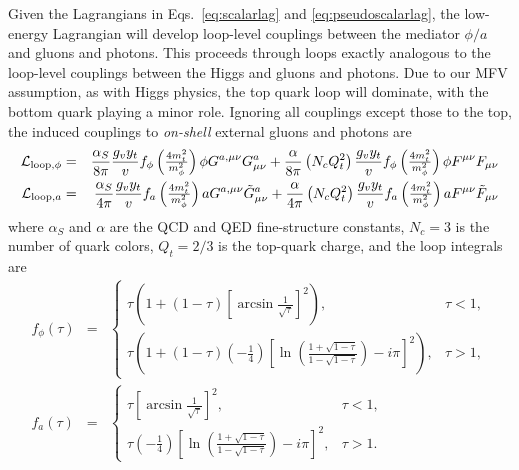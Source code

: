 Given the Lagrangians in Eqs.~\eqref{eq:scalarlag} and \ref{eq:pseudoscalarlag}, the low-energy Lagrangian will develop loop-level couplings between the mediator $\phi/a$ and gluons and photons. This proceeds through loops exactly analogous to the loop-level couplings between the Higgs and gluons and photons. Due to our MFV assumption, as with Higgs physics, the top quark loop will dominate, with the bottom quark playing a minor role. Ignoring all couplings except those to the top, the induced couplings to {\it on-shell} external gluons and photons are
\begin{eqnarray}
{\cal L}_{{\rm loop},\phi} & = & \frac{\alpha_S}{8\pi} \frac{g_v y_t}{v}f_\phi\left(\tfrac{4m_t^2}{m_\phi^2} \right)\phi G^{a,\mu\nu} G^{a}_{\mu\nu} + \frac{\alpha}{8\pi}\left(N_c Q_t^2 \right) \frac{g_v y_t}{v}f_\phi\left(\tfrac{4m_t^2}{m_\phi^2} \right) \phi F^{\mu\nu}F_{\mu\nu} \label{eq:scalarloop} \\ 
{\cal L}_{{\rm loop},a} & = &  \frac{\alpha_S}{4\pi} \frac{g_v y_t}{v}f_a\left(\tfrac{4m_t^2}{m_\phi^2} \right) a G^{a,\mu\nu} \tilde{G}^{a}_{\mu\nu} + \frac{\alpha}{4\pi}\left(N_c Q_t^2 \right) \frac{g_v y_t}{v}f_a\left(\tfrac{4m_t^2}{m_\phi^2} \right) a F^{\mu\nu}\tilde{F}_{\mu\nu} \label{eq:pseudoscalarloop}
\end{eqnarray}
where $\alpha_S$ and $\alpha$ are the QCD and QED fine-structure constants, $N_c = 3$ is the number of quark colors, $Q_t = 2/3$ is the top-quark charge, and the loop integrals are
\begin{eqnarray}
f_\phi(\tau) & = & \left\{\begin{array}{cc} \tau\left(1+(1-\tau)\left[\arcsin\tfrac{1}{\sqrt{\tau}}\right]^{2} \right),  & \tau < 1, \\  \tau\left(1+(1-\tau)\left(-\tfrac{1}{4}\right)\left[ \ln\left(\tfrac{1+\sqrt{1-\tau}}{1-\sqrt{1-\tau}} \right) - i \pi \right]^2 \right), & \tau > 1,\end{array} \right. \\
f_a(\tau) & = & \left\{\begin{array}{cc} \tau\left[\arcsin\tfrac{1}{\sqrt{\tau}}\right]^{2},  & \tau < 1, \\  \tau\left(-\tfrac{1}{4}\right)\left[ \ln\left(\tfrac{1+\sqrt{1-\tau}}{1-\sqrt{1-\tau}} \right) - i \pi \right]^2, & \tau > 1.\end{array} \right.
\end{eqnarray}

